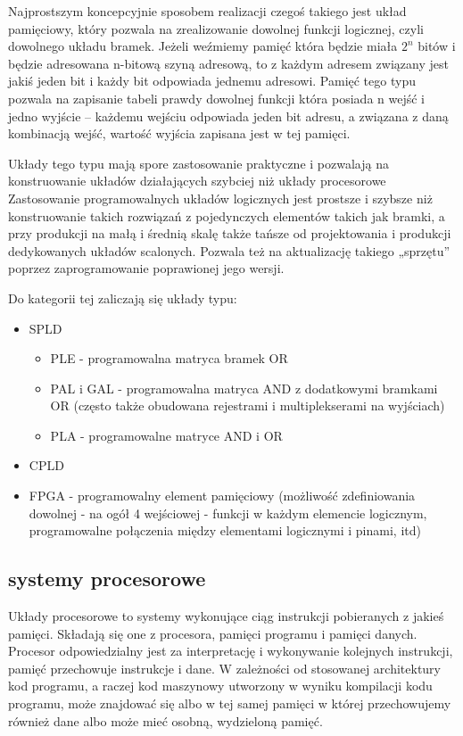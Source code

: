 Najprostszym koncepcyjnie sposobem realizacji czegoś takiego jest układ pamięciowy, który pozwala na zrealizowanie dowolnej funkcji logicznej, czyli dowolnego układu bramek. Jeżeli weźmiemy pamięć która będzie miała $2^n$ bitów i będzie adresowana n-bitową szyną adresową, to z każdym adresem związany jest jakiś jeden bit i każdy bit odpowiada jednemu adresowi. Pamięć tego typu pozwala na zapisanie tabeli prawdy dowolnej funkcji która posiada n wejść i jedno wyjście – każdemu wejściu odpowiada jeden bit adresu, a związana z daną kombinacją wejść, wartość wyjścia zapisana jest w tej pamięci.

Układy tego typu mają spore zastosowanie praktyczne i pozwalają na konstruowanie układów działających szybciej niż układy procesorowe Zastosowanie programowalnych układów logicznych jest prostsze i szybsze niż konstruowanie takich rozwiązań z pojedynczych elementów takich jak bramki, a przy produkcji na małą i średnią skalę także tańsze od projektowania i produkcji dedykowanych układów scalonych. Pozwala też na aktualizację takiego „sprzętu” poprzez zaprogramowanie poprawionej jego wersji.

Do kategorii tej zaliczają się układy typu:
\begin{itemize}
	\item SPLD
	\begin{itemize}
		\item PLE - programowalna matryca bramek OR
		\item PAL i GAL - programowalna matryca AND z dodatkowymi bramkami OR (często także obudowana rejestrami i multiplekserami na wyjściach)
		\item PLA - programowalne matryce AND i OR
	\end{itemize}
	\item CPLD
	\item FPGA - programowalny element pamięciowy (możliwość zdefiniowania dowolnej - na ogół 4 wejściowej - funkcji w każdym elemencie logicznym, programowalne połączenia między elementami logicznymi i pinami, itd)
\end{itemize}

\subsection{systemy procesorowe}

Układy procesorowe to systemy wykonujące ciąg instrukcji pobieranych z jakieś pamięci. Składają się one z procesora, pamięci programu i pamięci danych. Procesor odpowiedzialny jest za interpretację i wykonywanie kolejnych instrukcji, pamięć przechowuje instrukcje i dane. W zależności od stosowanej architektury kod programu, a raczej kod maszynowy utworzony w wyniku kompilacji kodu programu, może znajdować się albo w tej samej pamięci w której przechowujemy również dane albo może mieć osobną, wydzieloną pamięć.

